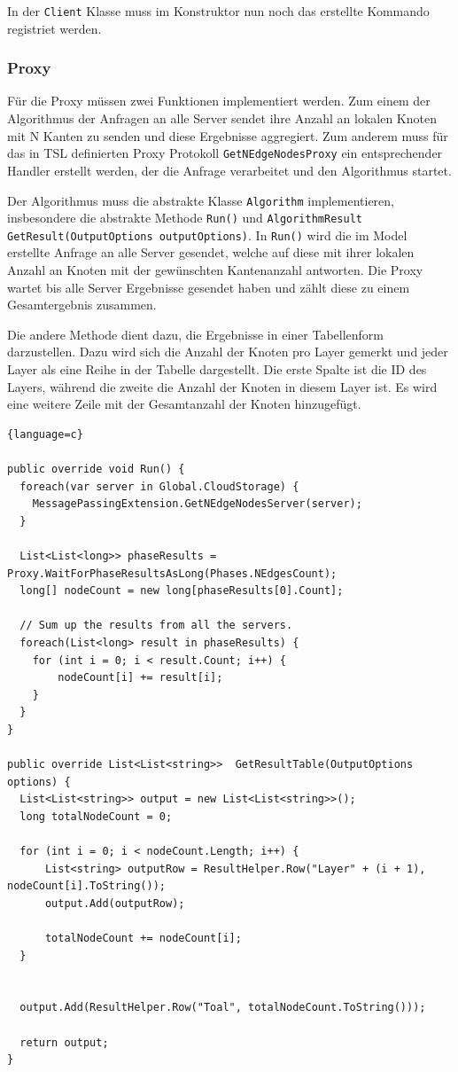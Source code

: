In der \verb|Client| Klasse muss im Konstruktor nun noch das erstellte Kommando registriet werden.

\subsubsection{Proxy}

Für die Proxy müssen zwei Funktionen implementiert werden. Zum einem der Algorithmus der Anfragen an alle Server sendet ihre Anzahl an lokalen Knoten mit N Kanten zu senden und diese Ergebnisse aggregiert. Zum anderem muss 
für das in TSL definierten Proxy Protokoll \verb|GetNEdgeNodesProxy| ein entsprechender Handler erstellt werden, der die Anfrage verarbeitet und den Algorithmus startet.

Der Algorithmus muss die abstrakte Klasse \verb|Algorithm| implementieren, insbesondere die abstrakte Methode \verb|Run()| und \verb|AlgorithmResult GetResult(OutputOptions outputOptions)|. In \verb|Run()| wird die im Model erstellte Anfrage an alle Server gesendet, welche auf diese mit ihrer lokalen Anzahl an Knoten mit der gewünschten Kantenanzahl antworten. Die Proxy
wartet bis alle Server Ergebnisse gesendet haben und zählt diese zu einem Gesamtergebnis zusammen.

Die andere Methode dient dazu, die Ergebnisse in einer Tabellenform darzustellen. Dazu wird sich die Anzahl der Knoten pro Layer gemerkt und jeder Layer als eine Reihe in der Tabelle dargestellt. Die erste Spalte ist die ID des Layers, während die zweite die Anzahl der Knoten in diesem Layer ist. Es wird eine weitere Zeile mit der Gesamtanzahl der Knoten hinzugefügt.

\begin{lstlisting}{language=c}

public override void Run() {
  foreach(var server in Global.CloudStorage) {
    MessagePassingExtension.GetNEdgeNodesServer(server);
  }

  List<List<long>> phaseResults =  Proxy.WaitForPhaseResultsAsLong(Phases.NEdgesCount);
  long[] nodeCount = new long[phaseResults[0].Count];

  // Sum up the results from all the servers.
  foreach(List<long> result in phaseResults) {
    for (int i = 0; i < result.Count; i++) {
        nodeCount[i] += result[i];
    }
  }
}

public override List<List<string>>  GetResultTable(OutputOptions options) {
  List<List<string>> output = new List<List<string>>();
  long totalNodeCount = 0;

  for (int i = 0; i < nodeCount.Length; i++) {
      List<string> outputRow = ResultHelper.Row("Layer" + (i + 1), nodeCount[i].ToString()); 
      output.Add(outputRow);

      totalNodeCount += nodeCount[i];
  }


  output.Add(ResultHelper.Row("Toal", totalNodeCount.ToString()));

  return output;
}



\end{lstlisting}


